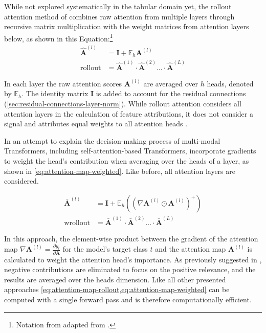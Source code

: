While not explored systematically in the tabular domain yet, the rollout attention method of \textcite[][3]{abnarQuantifyingAttentionFlow2020} combines raw attention from multiple layers through recursive matrix multiplication with the weight matrices from attention layers below, as shown in this Equation:\footnote{Notation from adapted from \textcite[][786]{cheferTransformerInterpretabilityAttention2021}.}
\begin{equation}
    \begin{aligned}
        \hat{\mathbf{A}}^{(l)}    & =\mathbf{I}+\mathbb{E}_h \mathbf{A}^{(l)}                                              \\
        \operatorname { rollout } & =\hat{\mathbf{A}}^{(1)} \cdot \hat{\mathbf{A}}^{(2)} \ldots\cdot\hat{\mathbf{A}}^{(L)}
    \end{aligned}
    \label{eq:attention-map-rollout}
\end{equation}

In each layer the raw attention scores $\mathbf{A}^{(l)}$ are averaged over $h$ heads, denoted by $\mathbb{E}_h$. The identity matrix $\mathbf{I}$ is added to account for the residual connections (\cref{sec:residual-connections-layer-norm}). While rollout attention considers all attention layers in the calculation of feature attributions, it does not consider a signal and attributes equal weights to all attention heads \autocite[][786]{cheferTransformerInterpretabilityAttention2021}.

In an attempt to explain the decision-making process of multi-modal Transformers, including self-attention-based Transformers, \textcite[][3]{cheferTransformerInterpretabilityAttention2021} incorporate gradients to weight the head's contribution when averaging over the heads of a layer, as shown in \cref{eq:attention-map-weighted}. Like before, all attention layers are considered.

\begin{equation}
    \begin{aligned}
        \bar{\mathbf{A}}^{(l)}   & =\mathbf{I} + \mathbb{E}_h\left(\left(\nabla \mathbf{A}^{(l)} \odot \mathbf{A}^{(l)}\right)^{+}\right) \\
        \operatorname {wrollout} & =\bar{\mathbf{A}}^{(1)} \cdot \bar{\mathbf{A}}^{(2)} \ldots \cdot \bar{\mathbf{A}}^{(L)}
    \end{aligned}
    \label{eq:attention-map-weighted}
\end{equation}

In this approach, the element-wise product between the gradient of the attention map $\nabla \mathbf{A}^{(l)}=\frac{\partial y_t}{\partial \mathbf{A}}$ for the model's target class $t$ and the attention map $\mathbf{A}^{(l)}$ is calculated to weight the attention head's importance. As previously suggested in \textcite[][786]{cheferTransformerInterpretabilityAttention2021}, negative contributions are eliminated to focus on the positive relevance, and the results are averaged over the heads dimension. Like all other presented approaches \cref{eq:attention-map-rollout,eq:attention-map-weighted} can be computed with a single forward pass and is therefore computationally efficient.

